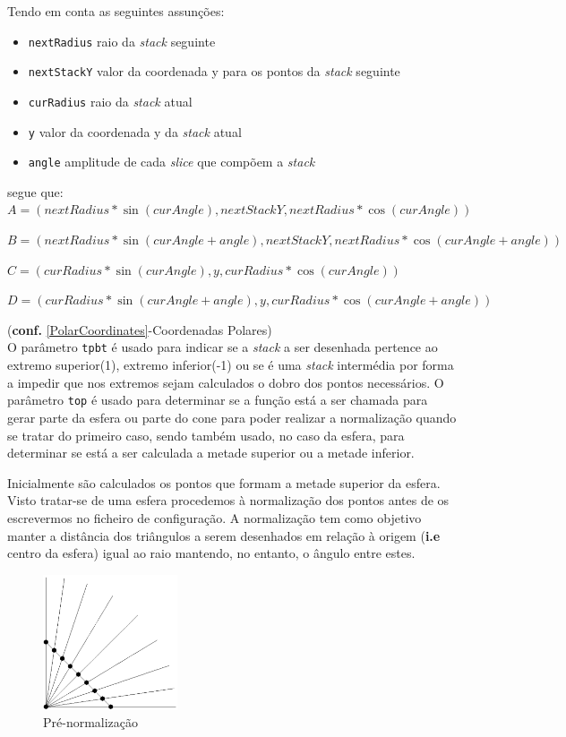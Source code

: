 \documentclass{article}
\begin{document}
Tendo em conta as seguintes assunções:
\begin{itemize}
    \item \texttt{nextRadius} raio da \textit{stack} seguinte
    \item \texttt{nextStackY} valor da coordenada y para os pontos da \textit{stack} seguinte
    \item \texttt{curRadius} raio da \textit{stack} atual
    \item \texttt{y} valor da coordenada y da \textit{stack} atual
    \item \texttt{angle} amplitude de cada \textit{slice} que compõem a \textit{stack}
\end{itemize}
segue que:
\\

$A=(nextRadius*\sin(curAngle),nextStackY,nextRadius*\cos(curAngle))$

$B=(nextRadius*\sin(curAngle+angle),nextStackY,nextRadius*\cos(curAngle+angle))$

$C=(curRadius*\sin(curAngle),y,curRadius*\cos(curAngle))$

$D=(curRadius*\sin(curAngle+angle),y,curRadius*\cos(curAngle+angle))$


(\textbf{conf.} \ref{PolarCoordinates}-Coordenadas Polares)
\\

O parâmetro \texttt{tpbt} é usado para indicar se a \textit{stack} a ser desenhada pertence ao extremo superior(1), extremo inferior(-1) ou se é uma \textit{stack} intermédia por forma a impedir que nos extremos sejam calculados o dobro dos pontos necessários. O parâmetro \texttt{top} é usado para determinar se a função está a ser chamada para gerar parte da esfera ou parte do cone para poder realizar a normalização quando se tratar do primeiro caso, sendo também usado, no caso da esfera, para determinar se está a ser calculada a metade superior ou a metade inferior.

Inicialmente são calculados os pontos que formam a metade superior da esfera. Visto tratar-se de uma esfera procedemos à normalização dos pontos antes de os escrevermos no ficheiro de configuração. A normalização tem como objetivo manter a distância dos triângulos a serem desenhados em relação à origem (\textbf{i.e} centro da esfera) igual ao raio mantendo, no entanto, o ângulo entre estes.

\begin{figure}[H]
    \centering
    \includegraphics[height=4cm]{beforeNorm.png}
    \caption{Pré-normalização}
\end{figure}
\end{document}
